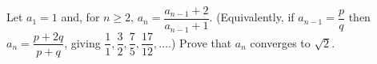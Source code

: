 Let $a_1=1$ and, for $n\ge2$, $a_n=\dfrac{a_{n-1}+2}{a_{n-1}+1}$. (Equivalently, if $a_{n-1}=\dfrac {p}{q}$ then $a_n=\dfrac{p+2q}{p+q}$, giving $\dfrac{1}{1},\dfrac{3}{2},\dfrac{7}{5},\dfrac{17}{12},\dots$.) Prove that $a_n$ converges to $\sqrt2$.
